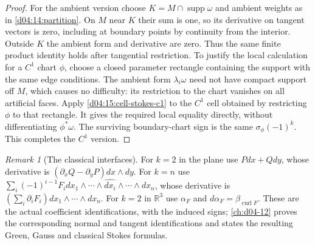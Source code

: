 \documentclass[11pt,oneside,openany]{book}
\theoremstyle{definition}
\theoremstyle{remark}
\newtheorem{remark}[theorem]{Remark}
\newcommand{\R}{\mathbb R}
\DeclareMathOperator{\supp}{supp}
\begin{document}
\begin{proof}
For the ambient version choose $K=M\cap\supp\omega$ and ambient weights
as in \cref{d04:14:partition}. On $M$ near $K$ their sum is one, so its
derivative on tangent vectors is zero, including at boundary points by
continuity from the interior. Outside $K$ the ambient form and derivative
are zero. Thus the same finite product identity holds after tangential
restriction. To justify the local calculation for a $C^1$ chart $\phi$,
choose a closed parameter rectangle containing the support with the same
edge conditions. The ambient form $\lambda_i\omega$ need not have compact
support off $M$, which causes no difficulty: its restriction to the chart
vanishes on all artificial faces. Apply
\cref{d04:15:cell-stokes-c1} to the $C^1$ cell obtained by restricting
$\phi$ to that rectangle. It gives the required local equality directly,
without differentiating $\phi^*\omega$. The surviving boundary-chart sign is
the same $\sigma_\phi(-1)^k$. This completes the $C^1$ version.
\end{proof}

\begin{remark}[The classical interfaces]\label{d04:15:classical-bridge}
For $k=2$ in the plane use $Pdx+Qdy$, whose derivative is
$(\partial_xQ-\partial_yP)dx\wedge dy$. For $k=n$ use
$\sum_i(-1)^{i-1}F_i dx_1\wedge\cdots\wedge\widehat{dx_i}
\wedge\cdots\wedge dx_n$, whose derivative is
$(\sum_i\partial_iF_i)dx_1\wedge\cdots\wedge dx_n$.
For $k=2$ in $\R^3$ use $\alpha_F$ and $d\alpha_F=\beta_{\operatorname{curl}F}$.
These are the actual coefficient identifications, with the induced signs;
\cref{ch:d04-12} proves the corresponding normal and tangent identifications
and states the resulting Green, Gauss and classical Stokes formulas.
\end{remark}
\end{document}
